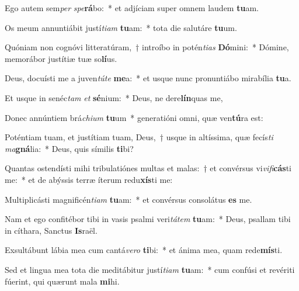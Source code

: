\item Ego autem sem\textit{per} \textit{spe}\textbf{rá}bo:~* et adjíciam super omnem laudem \textbf{tu}am.
\item Os meum annuntiábit justí\textit{ti}\textit{am} \textbf{tu}am:~* tota die salutáre \textbf{tu}um.
\item Quóniam non cognóvi litteratúram,~† introíbo in potén\textit{ti}\textit{as} \textbf{Dó}mini:~* Dómine, memorábor justítiæ tuæ so\textbf{lí}us.
\item Deus, docuísti me a juven\textit{tú}\textit{te} \textbf{me}a:~* et usque nunc pronuntiábo mirabília \textbf{tu}a.
\item Et usque in senéc\textit{tam} \textit{et} \textbf{sé}nium:~* Deus, ne dere\textbf{lín}quas me,
\item Donec annúntiem brá\textit{chi}\textit{um} \textbf{tu}um~* generatióni omni, quæ ven\textbf{tú}ra est:
\item Poténtiam tuam, et justítiam tuam, Deus,~† usque in altíssima, quæ fecís\textit{ti} \textit{ma}\textbf{gná}lia:~* Deus, quis símilis \textbf{ti}bi?
\item Quantas ostendísti mihi tribulatiónes multas et malas:~† et convérsus vi\textit{vi}\textit{fi}\textbf{cás}ti me:~* et de abýssis terræ íterum redu\textbf{xís}ti me:
\item Multiplicásti magnificén\textit{ti}\textit{am} \textbf{tu}am:~* et convérsus consolátus \textbf{es} me.
\item Nam et ego confitébor tibi in vasis psalmi veri\textit{tá}\textit{tem} \textbf{tu}am:~* Deus, psallam tibi in cíthara, Sanctus \textbf{Is}raël.
\item Exsultábunt lábia mea cum cantá\textit{ve}\textit{ro} \textbf{ti}bi:~* et ánima mea, quam rede\textbf{mís}ti.
\item Sed et lingua mea tota die meditábitur justí\textit{ti}\textit{am} \textbf{tu}am:~* cum confúsi et revériti fúerint, qui quærunt mala \textbf{mi}hi.
